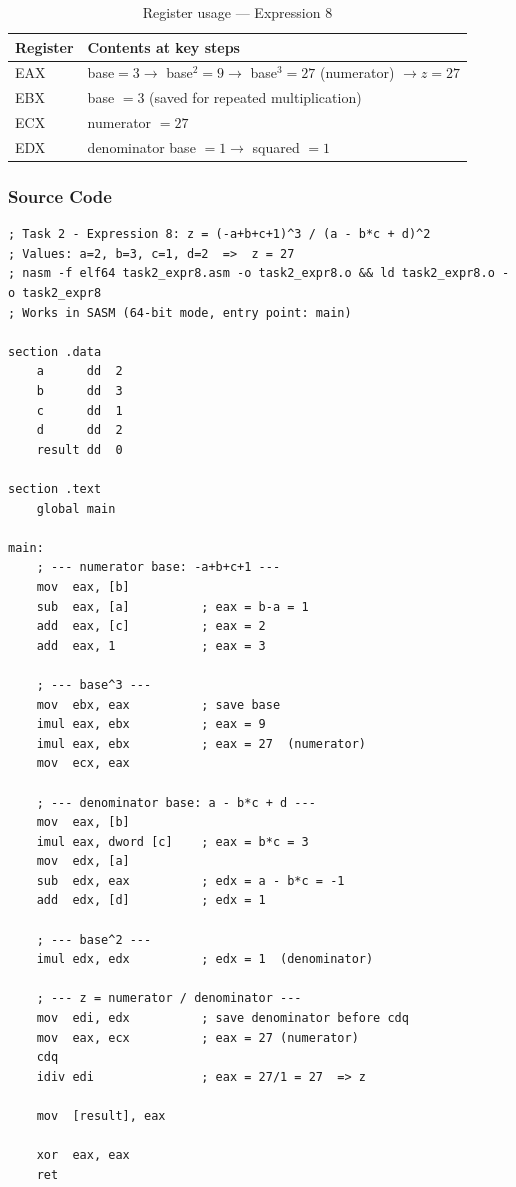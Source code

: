\documentclass[12pt,a4paper]{article}
\begin{document}
\begin{table}[H]
\centering
\caption{Register usage --- Expression 8}
\small
\begin{tabular}{|l|p{9cm}|}
\hline
\textbf{Register} & \textbf{Contents at key steps} \\
\hline
EAX & base$=3 \to$ base$^2=9 \to$ base$^3=27$ (numerator) $\to z=27$ \\
\hline
EBX & base $= 3$ (saved for repeated multiplication) \\
\hline
ECX & numerator $= 27$ \\
\hline
EDX & denominator base $= 1 \to$ squared $= 1$ \\
\hline
\end{tabular}
\end{table}

\subsubsection{Source Code}

\begin{lstlisting}[caption={task2\_expr8.asm --- Expression 8}]
; Task 2 - Expression 8: z = (-a+b+c+1)^3 / (a - b*c + d)^2
; Values: a=2, b=3, c=1, d=2  =>  z = 27
; nasm -f elf64 task2_expr8.asm -o task2_expr8.o && ld task2_expr8.o -o task2_expr8
; Works in SASM (64-bit mode, entry point: main)

section .data
    a      dd  2
    b      dd  3
    c      dd  1
    d      dd  2
    result dd  0

section .text
    global main

main:
    ; --- numerator base: -a+b+c+1 ---
    mov  eax, [b]
    sub  eax, [a]          ; eax = b-a = 1
    add  eax, [c]          ; eax = 2
    add  eax, 1            ; eax = 3

    ; --- base^3 ---
    mov  ebx, eax          ; save base
    imul eax, ebx          ; eax = 9
    imul eax, ebx          ; eax = 27  (numerator)
    mov  ecx, eax

    ; --- denominator base: a - b*c + d ---
    mov  eax, [b]
    imul eax, dword [c]    ; eax = b*c = 3
    mov  edx, [a]
    sub  edx, eax          ; edx = a - b*c = -1
    add  edx, [d]          ; edx = 1

    ; --- base^2 ---
    imul edx, edx          ; edx = 1  (denominator)

    ; --- z = numerator / denominator ---
    mov  edi, edx          ; save denominator before cdq
    mov  eax, ecx          ; eax = 27 (numerator)
    cdq
    idiv edi               ; eax = 27/1 = 27  => z

    mov  [result], eax

    xor  eax, eax
    ret
\end{lstlisting}
\end{document}
